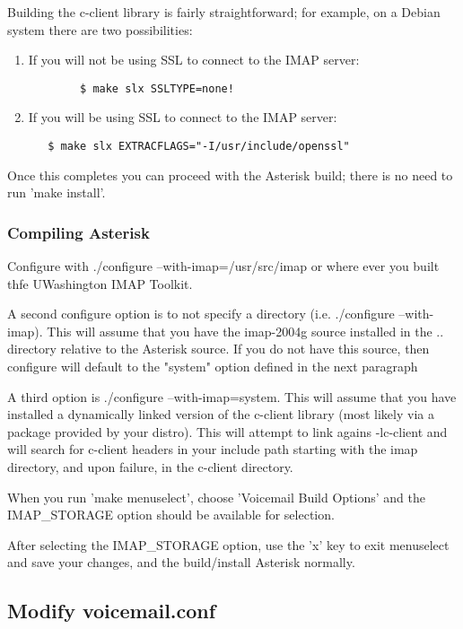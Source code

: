 Building the c-client library is fairly straightforward; for example, on a
Debian system there are two possibilities:

\begin{enumerate}
    \item If you will not be using SSL to connect to the IMAP server:
   \begin{verbatim}
        $ make slx SSLTYPE=none!
   \end{verbatim}
    \item If you will be using SSL to connect to the IMAP server:
   \begin{verbatim}
   $ make slx EXTRACFLAGS="-I/usr/include/openssl"
   \end{verbatim}
\end{enumerate}

Once this completes you can proceed with the Asterisk build; there is no
need to run 'make install'.

\subsubsection{Compiling Asterisk}

Configure with ./configure --with-imap=/usr/src/imap
or where ever you built thfe UWashington IMAP Toolkit. 

A second configure option is to not specify a directory (i.e.
./configure --with-imap). This will assume that you have the
imap-2004g source installed in the .. directory relative to the
Asterisk source. If you do not have this source, then configure will
default to the "system" option defined in the next paragraph

A third option is ./configure --with-imap=system. This will assume
that you have installed a dynamically linked version of the c-client
library (most likely via a package provided by your distro). This will
attempt to link agains -lc-client and will search for c-client headers
in your include path starting with the imap directory, and upon failure,
in the c-client directory.

When you run 'make menuselect', choose 'Voicemail Build Options' and the
IMAP\_STORAGE option should be available for selection.

After selecting the IMAP\_STORAGE option, use the 'x' key to exit
menuselect and save your changes, and the build/install Asterisk
normally.

\subsection{Modify voicemail.conf}


